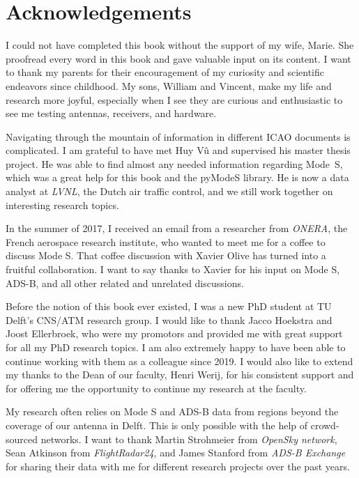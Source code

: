 \chapter*{Acknowledgements}

\vspace{-0.3cm}

{
I could not have completed this book without the support of my wife, Marie. She proofread every word in this book and gave valuable input on its content. I want to thank my parents for their encouragement of my curiosity and scientific endeavors since childhood. My sons, William and Vincent, make my life and research more joyful, especially when I see they are curious and enthusiastic to see me testing antennas, receivers, and hardware.

Navigating through the mountain of information in different ICAO documents is complicated. I am grateful to have met Huy V\^u and supervised his master thesis project. He was able to find almost any needed information regarding Mode~S, which was a great help for this book and the pyModeS library. He is now a data analyst at \emph{LVNL}, the Dutch air traffic control, and we still work together on interesting research topics. 

In the summer of 2017, I received an email from a researcher from \emph{ONERA}, the French aerospace research institute, who wanted to meet me for a coffee to discuss Mode S. That coffee discussion with Xavier Olive has turned into a fruitful collaboration. I want to say thanks to Xavier for his input on Mode S, ADS-B, and all other related and unrelated discussions.

Before the notion of this book ever existed, I was a new PhD student at TU Delft's CNS/ATM research group. I would like to thank Jacco Hoekstra and Joost Ellerbroek, who were my promotors and provided me with great support for all my PhD research topics. I am also extremely happy to have been able to continue working with them as a colleague since 2019. I would also like to extend my thanks to the Dean of our faculty, Henri Werij, for his consistent support and for offering me the opportunity to continue my research at the faculty. 

My research often relies on Mode S and ADS-B data from regions beyond the coverage of our antenna in Delft. This is only possible with the help of crowd-sourced networks. I want to thank Martin Strohmeier from \emph{OpenSky network}, Sean Atkinson from \emph{FlightRadar24}, and James Stanford from \emph{ADS-B Exchange} for sharing their data with me for different research projects over the past years.

}
